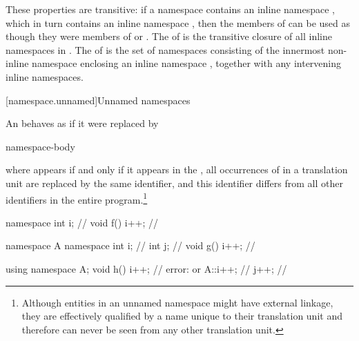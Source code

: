 \pnum
These properties are transitive: if a namespace  contains an inline namespace
, which in turn contains an inline namespace , then the members of
 can be used as though they were members of  or .
The  of  is the transitive closure of all
inline namespaces in .
The  of  is the set of namespaces
consisting of the innermost non-inline namespace enclosing
an inline namespace , together with any intervening inline namespaces.


[namespace.unnamed]{Unnamed namespaces}%

\pnum
An  behaves as if it were
replaced by

\begin{ncsimplebnf}
\opt {} \uniquens {}\br
{} \uniquens \terminal{;}\br
{} \uniquens \terminal{\{} namespace-body \terminal{\}}
\end{ncsimplebnf}

where
 appears if and only if it appears in the
,
all occurrences of \uniquens in a translation unit are replaced by
the same identifier, and this identifier differs from all other
identifiers in the entire program.\footnote{Although entities in an unnamed
namespace might have external linkage,
they are effectively qualified by a name unique to their translation
unit and therefore can never be seen from any other translation unit.}
\enterexample

\begin{codeblock}
namespace { int i; }            // \uniquens {}
void f() { i++; }               // \uniquens {}

namespace A {
  namespace {
    int i;                      //  \uniquens {}
    int j;                      //  \uniquens {}
  }
  void g() { i++; }             //  \uniquens {}
}

using namespace A;
void h() {
  i++;                          // error: \uniquens {} or  \uniquens {}
  A::i++;                       //  \uniquens {}
  j++;                          //  \uniquens {}
}
\end{codeblock}
\exitexample

